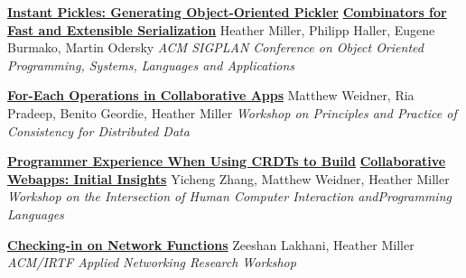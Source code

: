 \documentclass[9pt]{article}
\begin{document}
\noindent\href{http://infoscience.epfl.ch/record/188383}{\bf Instant Pickles: Generating Object-Oriented Pickler}\vspace{-0.03in}
\newline\noindent\href{http://infoscience.epfl.ch/record/188383}{\bf Combinators for Fast and Extensible Serialization}
\newline\noindent Heather Miller, Philipp Haller, Eugene Burmako, Martin Odersky
\newline\noindent\emph{ACM SIGPLAN Conference on Object Oriented Programming, Systems,}
\newline\noindent\emph{Languages and Applications}
\bigskip



\noindent\href{https://dl.acm.org/doi/10.1145/3578358.3591323}{\bf For-Each Operations in Collaborative Apps}
\newline\noindent Matthew Weidner, Ria Pradeep, Benito Geordie, Heather Miller
\newline\noindent\emph{Workshop on Principles and Practice of Consistency for Distributed Data}
\bigskip

\noindent\href{https://kilthub.cmu.edu/articles/conference_contribution/Programmer_Experience_When_Using_CRDTs_to_Build_Collaborative_Webapps_Initial_Insights/22277341/1}{\bf Programmer Experience When Using CRDTs to Build}\vspace{-0.03in}
\newline\noindent\href{https://kilthub.cmu.edu/articles/conference_contribution/Programmer_Experience_When_Using_CRDTs_to_Build_Collaborative_Webapps_Initial_Insights/22277341/1}{\bf Collaborative Webapps: Initial Insights}
\newline\noindent Yicheng Zhang, Matthew Weidner, Heather Miller
\newline\noindent\emph{Workshop on the Intersection of Human Computer Interaction and}\vspace{-0.03in}\newline\noindent\emph{Programming Languages}
\bigskip

\noindent\href{https://dl.acm.org/citation.cfm?id=3341131}{\bf Checking-in on Network Functions}
\newline\noindent Zeeshan Lakhani, Heather Miller
\newline\noindent\emph{ACM/IRTF Applied Networking Research Workshop}
\bigskip
\end{document}
